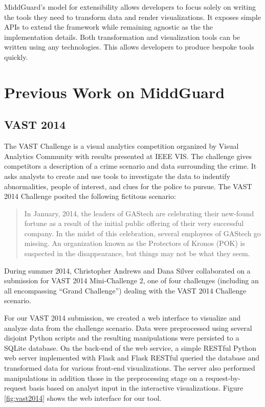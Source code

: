 \documentclass[midd]{thesis}
\begin{document}
MiddGuard's model for extensibility allows developers to focus solely on writing
the tools they need to transform data and render visualizations. It exposes
simple APIs to extend the framework while remaining agnostic as the the
implementation details. Both transformation and visualization tools can be
written using any technologies. This allows developers to produce bespoke tools
quickly.

\section{Previous Work on MiddGuard}

\subsection{VAST 2014}

The VAST Challenge is a visual analytics competition organized by Visual
Analytics Community with results presented at IEEE VIS. The challenge gives
competitors a description of a crime scenario and data surrounding the crime. It
asks analysts to create and use tools to investigate the data to indentify
abnormalities, people of interest, and clues for the police to pursue. The VAST
2014 Challenge \cite{vast2014} posited the following fictitous scenario:

\begin{quote}
In January, 2014, the leaders of GAStech are celebrating their new-found fortune
as a result of the initial public offering of their very successful company. In
the midst of this celebration, several employees of GAStech go missing. An
organization known as the Protectors of Kronos (POK) is suspected in the
disappearance, but things may not be what they seem.
\end{quote}

During summer 2014, Christopher Andrews and Dana Silver collaborated on a
submission for VAST 2014 Mini-Challenge 2, one of four challenges (including an
all encompassing ``Grand Challenge'') dealing with the VAST 2014 Challenge
scenario.

For our VAST 2014 submission, we created a web interface to visualize and
analyze data from the challenge scenario. Data were preprocessed using several
disjoint Python scripts and the resulting manipulations were persisted to a
SQLite database. On the back-end of the web service, a simple RESTful Python web
server implemented with Flask \cite{flask} and Flask RESTful
\cite{flask-restful} queried the database and transformed data for various
front-end visualizations. The server also performed manipulations in addition
those in the preprocessing stage on a request-by-request basis based on analyst
input in the interactive visualizations. Figure \ref{fig:vast2014} shows the web
interface for our tool.
\end{document}
